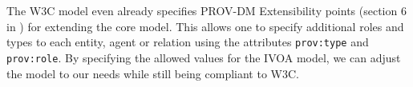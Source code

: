 The W3C model even already specifies PROV-DM Extensibility points (section 6 in \cite{std:W3CProvDM}) for extending the core model. This allows one to specify additional roles and types to each entity, agent or relation using the attributes \texttt{prov:type} and \texttt{prov:role}.
By specifying the allowed values for the IVOA model, we can adjust the model to our needs while still being compliant to W3C.

